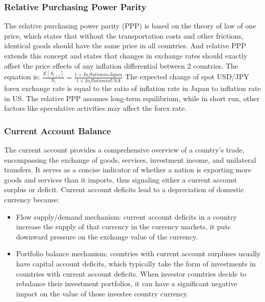 \documentclass{article}
\begin{document}
\subsubsection{Relative Purchasing Power Parity}
The relative purchasing power parity (PPP) is based on the theory of law of one price, which states that without the transportation costs and other frictions, identical goods should have the same price in all countries. And relative PPP extends this concept and states that changes in exchange rates should exactly offset the price effects of any inflation differential between 2 countries.
\newline
\newline
The equation is: \(\frac{E[S_{t+1}]}{S_t} = \frac{1+Inflation in Japan}{1+Inflation in USA} \)
\newline
\newline
The expected change of spot USD/JPY forex exchange rate is equal to the ratio of inflation rate in Japan to inflation rate in US.
\newline
\newline
The relative PPP assumes long-term equilibrium, while in short run, other factors like speculative activities may affect the forex rate.


\subsubsection{Current Account Balance}

The current account provides a comprehensive overview of a country's trade, encompassing the exchange of goods, services, investment income, and unilateral transfers. It serves as a concise indicator of whether a nation is exporting more goods and services than it imports, thus signaling either a current account surplus or deficit.
\newline
\newline
Current account deficits lead to a depreciation of domestic currency because:
\begin{itemize}
\item Flow supply/demand mechanism: current account deficits in a country increase the supply of that currency in the currency markets, it puts downward pressure on the exchange value of the currency. 
\item Portfolio balance mechanism: countries with current account surpluses usually have capital account deficits, which typically take the form of investments in countries with current account deficits. When investor countries decide to rebalance their investment portfolios, it can have a significant negative impact on the value of those investee country currency.
\end{itemize}
\end{document}
